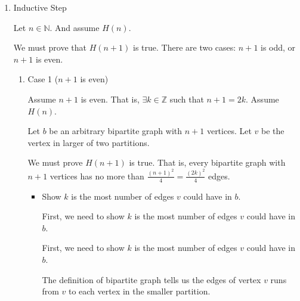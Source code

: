 \documentclass[12pt]{article}
\begin{document}
\begin{enumerate}[a.]
\begin{mdframed}
\begin{enumerate}[1.]
            \item Inductive Step

            \bigskip

            Let $n \in \mathbb{N}$. And assume $H(n)$.

            \bigskip

            We must prove that $H(n+1)$ is true. There are two cases: $n+1$ is odd, or
            $n+1$ is even.

            \bigskip

            \begin{enumerate}[1.]
                \item Case 1 ($n+1$ is even)

                \bigskip

                Assume $n+1$ is even. That is, $\exists k \in \mathbb{Z}$ such that
                $n+1 = 2k$. Assume $H(n)$.

                \bigskip

                Let $b$ be an arbitrary bipartite graph with $n+1$ vertices. Let
                $v$ be the vertex in larger of two partitions.

                \bigskip

                We must prove $H(n+1)$ is true. That is, every bipartite graph
                with $n+1$ vertices has no more than $\frac{(n+1)^2}{4} = \frac{(2k)^2}{4}$
                edges.

                \bigskip

                \begin{itemize}
                    \item Show $k$ is the most number of edges $v$ could have
                    in $b$.

                    \bigskip

                    First, we need to show $k$ is the most number of edges $v$
                    could have in $b$.

                    \begin{mdframed}
                    First, we need to show $k$ is the most number of edges $v$
                    could have in $b$.

                    \bigskip

                    The definition of bipartite graph tells us the edges of vertex
                    $v$ runs from $v$ to each vertex in the smaller partition.


\end{mdframed}
\end{itemize}
\end{enumerate}
\end{enumerate}
\end{mdframed}
\end{enumerate}
\end{document}
